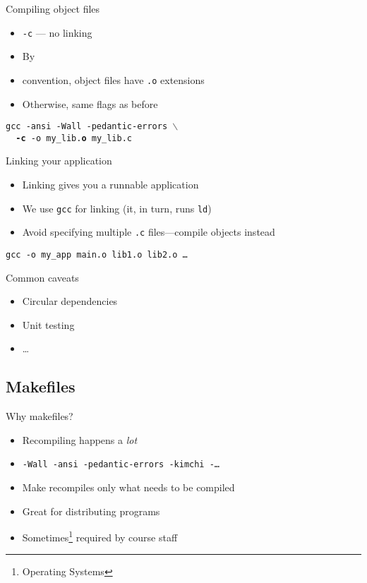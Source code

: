 \documentclass[handout]{beamer}
\begin{document}
\begin{frame}{Compiling object files}
  \begin{itemize}
    \item \texttt{-c} --- no linking
    \item By \item{convention}, object files have \texttt{.o} extensions
    \item Otherwise, same flags as before
  \end{itemize}

  \texttt{gcc -ansi -Wall -pedantic-errors $\backslash$ \\
  ~~\textbf{-c} -o my\_lib.\textbf{o} my\_lib.c}
\end{frame}

\begin{frame}{Linking your application}
  \begin{itemize}
    \item Linking gives you a runnable application
    \item We use \texttt{gcc} for linking (it, in turn, runs \texttt{ld})
    \item Avoid specifying multiple \texttt{.c} files---compile objects instead
  \end{itemize}

  \texttt{gcc -o my\_app main.o lib1.o lib2.o \ldots}
\end{frame}

\begin{frame}{Common caveats}
  \begin{itemize}
    \item Circular dependencies
    \item Unit testing
    \item \ldots
  \end{itemize}
\end{frame}

\subsection{Makefiles}

\begin{frame}{Why makefiles?}
  \begin{itemize}
    \item Recompiling happens a \emph{lot}
    \item \texttt{-Wall -ansi -pedantic-errors -kimchi -\ldots}
    \item Make recompiles only what needs to be compiled
    \item Great for distributing programs
      \pause
    \item Sometimes\footnote{Operating Systems} required by course staff
  \end{itemize}
\end{frame}
\end{document}
